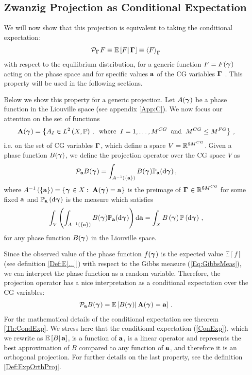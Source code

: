 \documentclass[10pt,a4paper]{book}
\theoremstyle{definition}
\begin{document}
\subsection{Zwanzig Projection as Conditional Expectation}
We will now show that this projection is equivalent to taking the conditional expectation: 
\begin{equation}
\mathcal{P}_{\boldsymbol\Gamma_{}}F \equiv \mathbb{E}\left[ {F} \middle\vert {\,\boldsymbol\Gamma_{}} \right] \equiv \left\langle F\right\rangle_{\boldsymbol\Gamma_{}}
\end{equation}
with respect to the equilibrium distribution, for a generic function $F=F(\boldsymbol\gamma_{})$ acting on the phase space and for specific values $\mathbf{a}$ of the CG variables $\boldsymbol\Gamma_{}$ \cite{Chorin2000,DiPasquale2019}. This property will be used in the following sections.

Below we show this property for a generic projection. Let $A(\boldsymbol\gamma_{})$ be a phase function in the Liouville space (see appendix \ref{App:C}).
We now focus our attention on the set of functions 
$$
\mathbf{A}(\boldsymbol\gamma_{})=\left\lbrace  A_I\in L^2\left(X,\mathbb{P}\right)\,,\;\;\mathrm{where}\;\; I=1,\ldots,M^{CG} \;\;\mathrm{and}\;\; M^{CG}\le M^{FG} \right\rbrace\,,
$$
i.e. on the set of CG variables $\boldsymbol\Gamma_{}$, which define a space $V=\mathbb{R}^{6M^{CG}}$. Given a phase function $B(\boldsymbol\gamma_{})$, we define the projection operator over the CG space $V$ as
\begin{equation*}
 \mathcal{P}_{\mathbf{a}}B(\boldsymbol\gamma_{}) = \int_{A^{-1}\left(\left\lbrace \mathbf{a}\right\rbrace\right)}B(\boldsymbol\gamma_{})\mathbb{P}_{\mathbf{a}}(\mbox{d}\boldsymbol\gamma_{})\,,
\end{equation*}
where $A^{-1}\left(\left\lbrace \mathbf{a}\right\rbrace\right)=\left\lbrace \boldsymbol\gamma_{} \in X:\;\mathbf{A}(\boldsymbol\gamma_{})= \mathbf{a}\right\rbrace$ is the preimage of $\boldsymbol\Gamma_{}\in \mathbb{R}^{6M^{CG}}$ for some fixed $\mathbf{a}$ and $\mathbb{P}_{\mathbf{a}}\left(\mbox{d} \boldsymbol\gamma_{}\right)$ is the measure which satisfies
$$
\int_V\left(\int_{A^{-1}\left(\left\lbrace \mathbf{a}\right\rbrace\right)}B(\boldsymbol\gamma_{})\mathbb{P}_{\mathbf{a}}(\mbox{d}\boldsymbol\gamma_{})\right)\mbox{d} \mathbf{a} = \int_X B\left(\boldsymbol\gamma_{}\right)\mathbb{P}\left(\mbox{d}\boldsymbol\gamma_{}\right)\,,
$$
for any phase function $B(\boldsymbol\gamma_{})$ in the Liouville space.

Since the observed value of the phase function $f(\boldsymbol\gamma_{})$ is the expected value $\mathbb{E}[f]$ (see definition \ref{Def:E[...]}) with respect to the Gibbs measure (\ref{Eq:GibbsMeas}), we can interpret the phase function as a random variable.  
Therefore, the projection operator has a nice interpretation as a conditional expectation over the CG variables:
\begin{equation}\label{ConExp}
 \mathcal{P}_{\mathbf{a}}B(\boldsymbol\gamma_{}) = \mathbb{E}\left[ {B(\boldsymbol\gamma_{})} \middle\vert {\,\mathbf{A}(\boldsymbol\gamma_{})=\mathbf{a}} \right]\,.
\end{equation}
For the mathematical details of the conditional expectation see theorem \ref{Th:CondExp}. 
We stress here that the conditional expectation (\ref{ConExp}), which we rewrite as  $\mathbb{E}\left[ {B} \middle\vert {\,\mathbf{a}} \right]$, is a function of $\mathbf{a}$, is a linear operator and represents the best approximation of $B$ compared to any function of $\mathbf{a}$, and therefore it is an orthogonal projection. For further details on the last property, see the definition \ref{Def:ExpOrthProj}.
\end{document}
